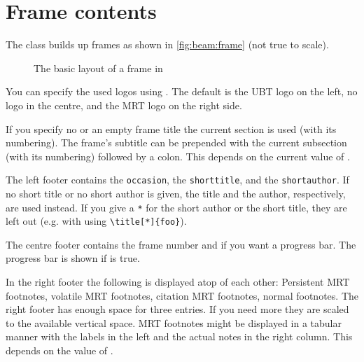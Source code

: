 \section{Frame contents}
The class builds up frames as shown in \autoref{fig:beam:frame} (not true to
scale).
\begin{figure}[!bp]
  \centering
  \caption{The basic layout of a frame in }
  \label{fig:beam:frame}
\end{figure}

You can specify the used logos using . The default is the UBT logo
on the left, no logo in the centre, and the MRT logo on the right side.

If you specify no or an empty frame title the current section is used (with its
numbering). The frame's subtitle can be prepended with the current subsection
(with its numbering) followed by a colon. This depends on the current value of
.

The left footer contains the \texttt{occasion}, the \texttt{shorttitle}, and the
\texttt{shortauthor}. If no short title or no short author is given, the title
and the author, respectively, are used instead. If you give a \texttt{*} for the
short author or the short title, they are left out (e.g. with using
\verb|\title[*]{foo}|).

The centre footer contains the frame number and if you want a progress bar. The
progress bar is shown if  is true.

In the right footer the following is displayed atop of each other: Persistent
MRT footnotes, volatile MRT footnotes, citation MRT footnotes, normal footnotes.
The right footer has enough space for three entries. If you need more they are
scaled to the available vertical space. MRT footnotes might be displayed in a
tabular manner with the labels in the left and the actual notes in the right
column. This depends on the value of .

